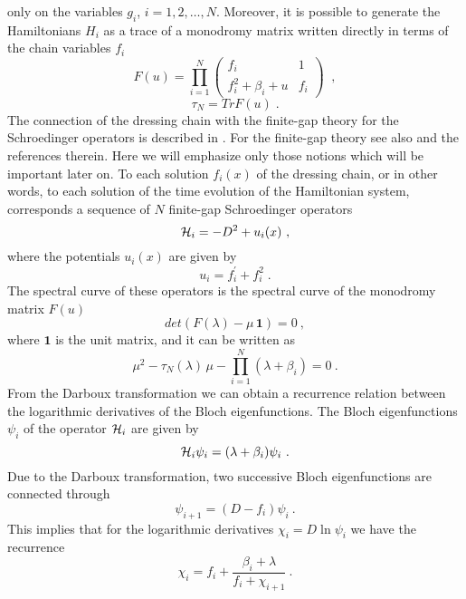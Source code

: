 \documentclass[a4paper,11pt]{article}
\begin{document}
only on the variables $g_i$, $i=1,2,\ldots,N$. Moreover, it is possible to
generate the Hamiltonians $H_i$ as a trace of a monodromy matrix written
directly in terms of the chain variables $f_i$
\begin{equation}
\label{mono_f}
F(u)=\prod_{i=1}^N \left(\begin{array}{cc}
          f_i      & 1  \\
           f_i^2+\beta_i+u      &  f_i
         \end{array}\right )\;\;,
\end{equation}
\begin{equation}
\label{tau_f}
\tau _N=Tr F(u)\;.
\end{equation}
The connection of the dressing chain with the finite-gap theory for the
Schroedinger operators is described in \cite{Veselov}. For the finite-gap
theory see also \cite{Novikov1,Novikov2} and the references therein.  Here
we will emphasize only those notions which will be important later on. To
each solution $f_i(x)$ of the dressing chain, or in other words, to each
solution of the time evolution of the Hamiltonian system, corresponds a
sequence of $N$ finite-gap Schroedinger operators
\begin{equation}
\label{Sch_fin}
{\cal H}_i=-D^2+u_i(x) ~,
\end{equation}
where the potentials $u_i(x)$ are given by
\begin{equation}
\label{pot}
u_i=f_i^{'}+f_i^2\;.
\end{equation}
The spectral curve of these operators is the spectral curve of the monodromy
matrix $F(u)$
\begin{equation}
\label{spec_curve}
det(F(\lambda)-\mu \, \mathbf{1})=0 ~,
\end{equation}
where $ \mathbf{1}$ is the unit matrix, and it can be written as
\begin{equation}
\label{spec2}
\mu^2-\tau _N(\lambda) \, \mu-\prod _{i=1}^N(\lambda +\beta_i)=0 ~.
\end{equation}
{}From the Darboux transformation we can obtain a recurrence relation
between the logarithmic derivatives of the Bloch eigenfunctions. The Bloch
eigenfunctions $\psi _i$ of the operator ${\cal H}_i$ are given by
\begin{equation}
\label{Bloch}
{\cal H}_i\psi _i=(\lambda+\beta _i)\psi _i ~.
\end{equation}
Due to the Darboux transformation, two successive Bloch eigenfunctions are
connected through
\begin{equation}
\label{con}
\psi _{i+1}=(D-f_i)\psi _i ~.
\end{equation}
This implies that for the logarithmic derivatives $\chi _i=D\ln \psi_i$ we
have the recurrence
\begin{equation}
\label{rec_chi}
\chi_i=f_i+\frac{\beta_i+\lambda}{f_i+\chi_{i+1}} ~.
\end{equation}
\end{document}
